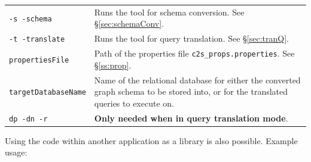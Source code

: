 \documentclass[letterpaper]{ltxdoc}
\begin{document}
\begin{center}
\begin{tabular}{ p{3cm} p{10.5cm} }
\texttt{-s \textbar{} -schema} & Runs the tool for schema conversion. See \S \ref{sec:schemaConv}. \\
\texttt{-t \textbar{} -translate} & Runs the tool for query translation. See \S \ref{sec:tranQ}. \\
\texttt{propertiesFile} & Path of the properties file \texttt{c2s\_props.properties}. See \S \ref{ss:prop}. \\
\texttt{targetDatabaseName} & Name of the relational database for either the converted graph schema to be stored into, or for the translated queries to execute on. \\
\texttt{dp \textbar{} -dn \textbar{} -r} & \textbf{Only needed when in query translation mode}.
\end{tabular}
\end{center}

\medskip

Using the code within another application as a library is also possible. Example usage:
\end{document}
